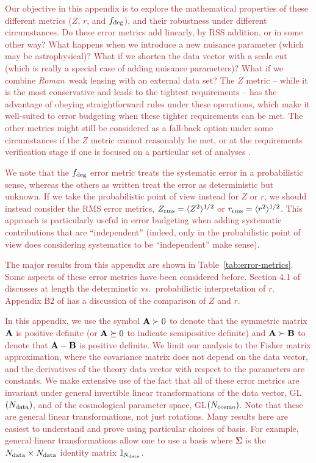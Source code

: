 \documentclass[usenatbib]{mnras}
\newcommand{\wfirst}{{\slshape Roman}}
\newcommand{\changetext}[1]{\textcolor{brown}{#1}}
\begin{document}
\changetext{Our objective in this appendix is to explore the mathematical properties of these different metrics ($Z$, $r$, and $f_{\rm deg}$), and their robustness under different circumstances. Do these error metrics add linearly, by RSS addition, or in some other way? What happens when we introduce a new nuisance parameter (which may be astrophysical)? What if we shorten the data vector with a scale cut (which is really a special case of adding nuisance parameters)? What if we combine \wfirst\ weak lensing with an external data set?
The $Z$ metric -- while it is the most conservative and leads to the tightest requirements -- has the advantage of obeying straightforward rules under these operations, which make it well-suited to error budgeting when these tighter requirements can be met. The other metrics might still be considered as a fall-back option under some circumstances if the $Z$ metric cannot reasonably be met, or at the requirements verification stage if one is focused on a particular set of analyses \citep[e.g.][]{2020A&A...635A.139E}.}

\changetext{We note that the $f_{\rm deg}$ error metric treats the systematic error in a probabilistic sense, whereas the others as written treat the error as deterministic but unknown. If we take the probabilistic point of view instead for $Z$ or $r$, we should instead consider the RMS error metrics, $Z_{\rm rms} = \langle Z^{2}\rangle^{1/2}$ or $r_{\rm rms} = \langle r^2\rangle^{1/2}$. This approach is particularly useful in error budgeting when adding systematic contributions that are ``independent'' (indeed, only in the probabilistic point of view does considering systematics to be ``independent'' make sense).}

\changetext{The major results from this appendix are shown in Table~\ref{tab:error-metrics}. Some aspects of these error metrics have been considered before. Section 4.1 of \citet{2013MNRAS.429..661M} discusses at length the determinstic vs.\ probabilistic interpretation of $r$. Appendix B2 of \citet{2018arXiv180901669T} has a discussion of the comparison of $Z$ and $r$.}

\changetext{In this appendix, we use the symbol ${\bf A}\succ 0$ to denote that the symmetric matrix ${\bf A}$ is positive definite (or ${\bf A}\succeq 0$ to indicate semipositive definite) and ${\bf A}\succ{\bf B}$ to denote that ${\bf A}-{\bf B}$ is positive definite. We limit our analysis to the Fisher matrix approximation, where the covariance matrix does not depend on the data vector, and the derivatives of the theory data vector with respect to the parameters are constants. We make extensive use of the fact that all of these error metrics are invariant under general invertible linear transformations of the data vector, GL$(N_{\rm data})$, and of the cosmological parameter space, GL$(N_{\rm cosmo})$. Note that these are general linear transformations, not just rotations. Many results here are easiest to understand and prove using particular choices of basis. For example, general linear transformations allow one to use a basis where ${\boldsymbol\Sigma}$ is the $N_{\rm data}\times N_{\rm data}$ identity matrix ${\mathbb I}_{N_{\rm data}}$.}
\end{document}
